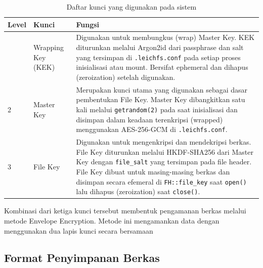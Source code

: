 \begin{table}[H]
    \centering
    \caption{Daftar kunci yang digunakan pada sistem}
    \label{t:tabel-kunci-sistem}

    \begin{tabularx}{\textwidth}{|
        >{\centering\arraybackslash}p{1cm}|
        >{\arraybackslash}p{4cm}|
        >{\arraybackslash}X|}
        \hline

        \rowcolor[HTML]{C0C0C0}
        \textbf{Level}
        & \textbf{Kunci}
        & \textbf{Fungsi} \\
        \hline

        1
        & Wrapping Key (KEK)
        & Digunakan untuk membungkus (wrap) Master Key.
          KEK diturunkan melalui Argon2id dari passphrase
          dan salt yang tersimpan di
          \texttt{.leichfs.conf} pada setiap proses inisialisasi
          atau mount. Bersifat ephemeral dan dihapus (zeroization) setelah
          digunakan. \\
        \hline

        2
        & Master Key
        & Merupakan kunci utama yang digunakan sebagai dasar
          pembentukan File Key. Master Key dibangkitkan satu kali
          melalui \texttt{getrandom(2)} pada saat inisialisasi
          dan disimpan dalam keadaan terenkripsi (wrapped) menggunakan
          AES-256-GCM di \texttt{.leichfs.conf}. \\
        \hline

        3
        & File Key
        & Digunakan untuk mengenkripsi dan mendekripsi berkas.
          File Key diturunkan melalui HKDF-SHA256
          dari Master Key dengan \texttt{file\_salt} yang tersimpan
          pada file header. File Key dibuat untuk masing-masing berkas
          dan disimpan secara efemeral di \texttt{FH::file\_key}
          saat \texttt{open()} lalu dihapus (zeroization) saat
          \texttt{close()}. \\
        \hline

    \end{tabularx}
\end{table}

Kombinasi dari ketiga kunci tersebut membentuk pengamanan berkas melalui metode Envelope Encryption. Metode ini mengamankan data dengan menggunakan dua lapis kunci secara bersamaan 

\subsection{Format Penyimpanan Berkas}

